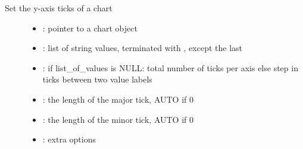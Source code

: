 \documentclass[letterpaper,10pt,english]{sphinxmanual}
\begin{document}
\begin{fulllineitems}
\label{\detokenize{object-types/chart:_CPPv420lv_chart_set_y_ticksP8lv_obj_tPKc7uint8_t7uint8_t7uint8_t23lv_chart_axis_options_t}}%
\pysigstartmultiline
{}\label{\detokenize{object-types/chart:lv__chart_8h_1adb0d1466a4560bb83d033787f714c9af}}%
\pysigstopmultiline
Set the y-axis ticks of a chart \begin{description}
\item[{}] \leavevmode\begin{itemize}
\item {} 
: pointer to a chart object 

\item {} 
: list of string values, terminated with 
, except the last 


\item {} 
: if list\_of\_values is NULL: total number of ticks per axis else step in ticks between two value labels 

\item {} 
: the length of the major tick, AUTO if 0 

\item {} 
: the length of the minor tick, AUTO if 0 

\item {} 
: extra options 

\end{itemize}

\end{description}


\end{fulllineitems}

\end{document}
